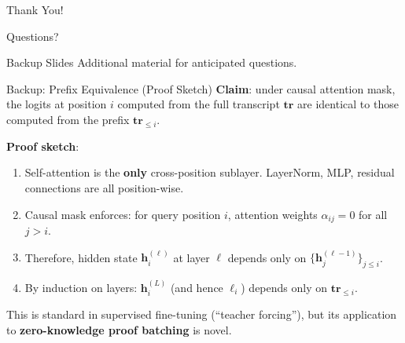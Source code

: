 \documentclass[aspectratio=169,10pt]{beamer}
\newcommand{\tr}{\mathbf{tr}}
\begin{document}
\begin{frame}
\centering
\vspace{2cm}
{\LARGE Thank You!}

\vspace{1cm}
{\large Questions?}
\end{frame}

\appendix
\begin{frame}{Backup Slides}
\centering
{\large Additional material for anticipated questions.}
\end{frame}

\begin{frame}{Backup: Prefix Equivalence (Proof Sketch)}
\label{slide:prefix-equiv}
\textbf{Claim}: under causal attention mask, the logits at position $i$ computed from the full transcript $\tr$ are identical to those computed from the prefix $\tr_{\leq i}$.

\vspace{6pt}
\textbf{Proof sketch}:
\begin{enumerate}
  \item Self-attention is the \textbf{only} cross-position sublayer. LayerNorm, MLP, residual connections are all position-wise.
  \item Causal mask enforces: for query position $i$, attention weights $\alpha_{ij} = 0$ for all $j > i$.
  \item Therefore, hidden state $\mathbf{h}_i^{(\ell)}$ at layer $\ell$ depends only on $\{\mathbf{h}_j^{(\ell-1)}\}_{j \leq i}$.
  \item By induction on layers: $\mathbf{h}_i^{(L)}$ (and hence $\boldsymbol{\ell}_i$) depends only on $\tr_{\leq i}$.
\end{enumerate}

\vspace{4pt}
This is standard in supervised fine-tuning (``teacher forcing''), but its application to \textbf{zero-knowledge proof batching} is novel.
\end{frame}
\end{document}
